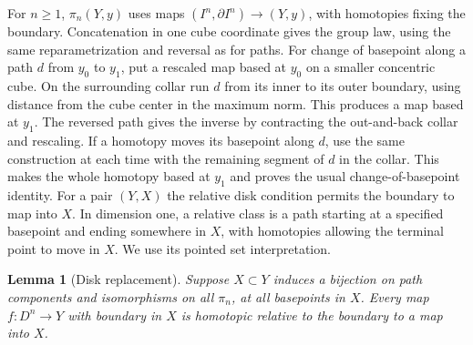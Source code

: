 \documentclass[11pt,oneside,openany]{book}
\theoremstyle{plain}
\newtheorem{lemma}[theorem]{Lemma}
\theoremstyle{definition}
\theoremstyle{remark}
\begin{document}
For \(n\ge1\), \(\pi_n(Y,y)\) uses maps
\((I^n,\partial I^n)\to(Y,y)\), with homotopies fixing
the boundary. Concatenation in one cube coordinate
gives the group law, using the same reparametrization
and reversal as for paths. For change of basepoint along
a path \(d\) from \(y_0\) to \(y_1\), put a rescaled map
based at \(y_0\) on a smaller concentric cube. On the
surrounding collar run \(d\) from its inner to its outer
boundary, using distance from the cube center in the
maximum norm. This produces a map based at \(y_1\).
The reversed path gives the inverse by contracting the
out-and-back collar and rescaling. If a homotopy moves
its basepoint along \(d\), use the same construction at
each time with the remaining segment of \(d\) in the
collar. This makes the whole homotopy based at \(y_1\)
and proves the usual change-of-basepoint identity.
For a pair \((Y,X)\) the relative disk condition permits
the boundary to map
into \(X\). In dimension one, a relative class is a
path starting at a specified basepoint and ending
somewhere in \(X\), with homotopies allowing the
terminal point to move in \(X\). We use its pointed
set interpretation.

\begin{lemma}[Disk replacement]
\label{lem:p202-whitehead-disk}
Suppose \(X\subset Y\) induces a bijection on path
components and isomorphisms on all \(\pi_n\), at
all basepoints in \(X\). Every map \(f:D^n\to Y\)
with boundary in \(X\) is homotopic relative to
the boundary to a map into \(X\).
\end{lemma}
\end{document}
